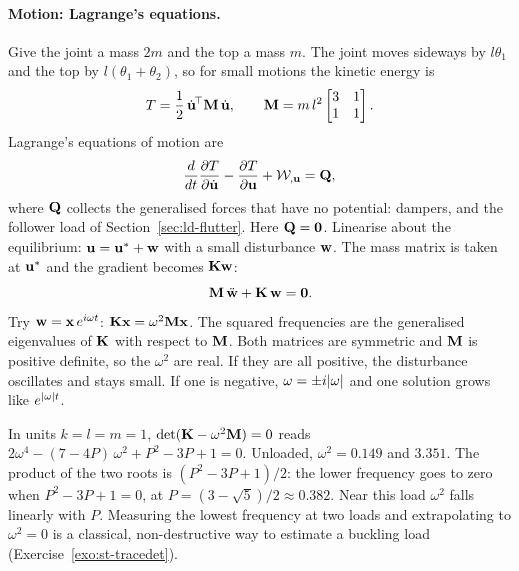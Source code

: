 \paragraph{Motion: Lagrange's equations.}
Give the joint a mass $2m$ and the top a mass $m$. The joint moves sideways by
$l\theta_1$ and the top by $l(\theta_1 + \theta_2)$, so for small motions the
kinetic energy is
\begin{equation}\label{eq:ld-kinetic}
  T = \frac12\,\dot{\mathbf{u}}^{\!\top}\mathbf{M}\,\dot{\mathbf{u}}, \qquad
  \mathbf{M} = m\,l^2\begin{bmatrix} 3 & 1 \\ 1 & 1 \end{bmatrix} .
\end{equation}
Lagrange's equations of motion are
\begin{equation}\label{eq:ld-lagrange}
  \frac{d}{dt}\frac{\partial T}{\partial\dot{\mathbf{u}}} - \frac{\partial T}{\partial\mathbf{u}}
  + \mathcal{W}_{,\mathbf{u}} = \mathbf{Q},
\end{equation}
where $\mathbf{Q}$ collects the generalised forces that have no potential: dampers,
and the follower load of Section~\ref{sec:ld-flutter}. Here $\mathbf{Q} = \mathbf{0}$.
Linearise about the equilibrium: $\mathbf{u} = \mathbf{u}^* + \mathbf{w}$ with a small
disturbance $\mathbf{w}$. The mass matrix is taken at $\mathbf{u}^*$ and the gradient becomes
$\mathbf{K}\mathbf{w}$:
\begin{equation}\label{eq:ld-linear-motion}
  \mathbf{M}\,\ddot{\mathbf{w}} + \mathbf{K}\,\mathbf{w} = \mathbf{0} .
\end{equation}
Try $\mathbf{w} = \mathbf{x}\,e^{i\omega t}$: $\mathbf{K}\mathbf{x} = \omega^2\mathbf{M}\mathbf{x}$.
The squared frequencies are the generalised eigenvalues of $\mathbf{K}$ with respect
to $\mathbf{M}$. Both matrices are symmetric and $\mathbf{M}$ is positive definite, so
the $\omega^2$ are real. If they are all positive, the disturbance oscillates and
stays small. If one is negative, $\omega = \pm i\lvert \omega\rvert$ and one solution grows
like $e^{\lvert \omega\rvert t}$.
%

\begin{example}\label{ex:ld-chain-freq}
In units $k = l = m = 1$, $\det(\mathbf{K} - \omega^2\mathbf{M}) = 0$ reads
$2\omega^4 - (7 - 4P)\,\omega^2 + P^2 - 3P + 1 = 0$. Unloaded, $\omega^2 = 0.149$ and
$3.351$. The product of the two roots is $(P^2 - 3P + 1)/2$: the lower frequency goes
to zero when $P^2 - 3P + 1 = 0$, at $P = (3 - \sqrt5)/2 \approx 0.382$. Near this load
$\omega^2$ falls linearly with $P$. Measuring the lowest frequency at two loads
and extrapolating to $\omega^2 = 0$ is a classical, non-destructive way to estimate a
buckling load (Exercise~\ref{exo:st-tracedet}).
\end{example}

